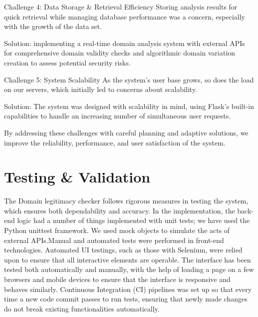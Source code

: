 Challenge 4: Data Storage \& Retrieval Efficiency
Storing analysis results for quick retrieval while managing database performance was a concern, especially with the growth of the data set.

Solution: implementing a real-time domain analysis system with external APIs for comprehensive domain validity checks and algorithmic domain variation creation to assess potential security risks. 
 
Challenge 5: System Scalability
As the system's user base grows, so does the load on our servers, which initially led to concerns about scalability.

Solution: The system was designed with scalability in mind, using Flask's built-in capabilities to handle an increasing number of simultaneous user requests. 

By addressing these challenges with careful planning and adaptive solutions, we improve the reliability, performance, and user satisfaction of the system.

\section{Testing \& Validation}

The Domain legitimacy checker follows rigorous measures in testing the system, which ensures both dependability and accuracy. In the implementation, the back-end logic had a number of things implemented with unit tests; we have used the Python unittest framework. We used mock objects to simulate the acts of external APIs.Manual and automated tests were performed in front-end technologies. Automated UI testings, such as those with Selenium, were relied upon to ensure that all interactive elements are operable. The interface has been tested both automatically and manually, with the help of loading a page on a few browsers and mobile devices to ensure that the interface is responsive and behaves similarly. Continuous Integration (CI) pipelines was set up so that every time a new code commit passes to run tests, ensuring that newly made changes do not break existing functionalities automatically. 

